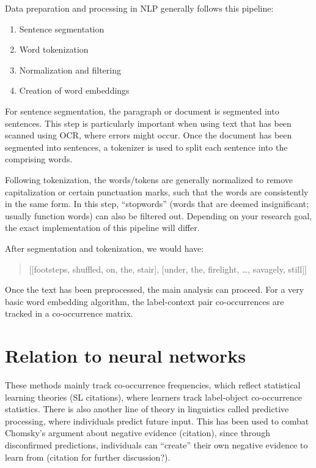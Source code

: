 Data preparation and processing in NLP generally follows this pipeline: 

\begin{enumerate}
\item Sentence segmentation
\item Word tokenization
\item Normalization and filtering
\item Creation of word embeddings
\end{enumerate}

For sentence segmentation, the paragraph or document is segmented into sentences. This step is particularly important when using text that has been scanned using OCR, where errors might occur.
Once the document has been segmented into sentences, a tokenizer is used to split each sentence into the comprising words. 

Following tokenization, the words/tokens are generally normalized to remove capitalization or certain punctuation marks, such that the words are consistently in the same form.
In this step, ``stopwords'' (words that are deemed insignificant; usually function words) can also be filtered out.
Depending on your research goal, the exact implementation of this pipeline will differ.


After segmentation and tokenization, we would have: 
\begin{quote}
[[footsteps, shuffled, on, the, stair], 
[under, the, firelight, \dots, savagely, still]]
\end{quote}

Once the text has been preprocessed, the main analysis can proceed. For a very basic word embedding algorithm, the label-context pair co-occurrences are tracked in a co-occurrence matrix.

\section{Relation to neural networks}


These methods mainly track co-occurrence frequencies, which reflect statistical learning theories (SL citations), where learners track label-object co-occurrence statistics.
There is also another line of theory in linguistics called predictive processing, where individuals predict future input. This has been used to combat Chomsky's argument about negative evidence (citation), since through disconfirmed predictions, individuals can ``create'' their own negative evidence to learn from (citation for further discussion?).

